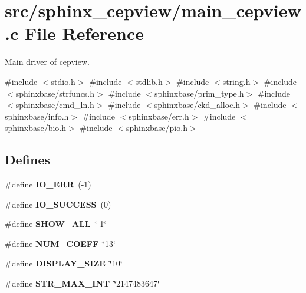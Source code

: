 \section{src/sphinx\-\_\-cepview/main\-\_\-cepview.c \-File \-Reference}
\label{main__cepview_8c}


\-Main driver of cepview.  


{\ttfamily \#include $<$stdio.\-h$>$}\*
{\ttfamily \#include $<$stdlib.\-h$>$}\*
{\ttfamily \#include $<$string.\-h$>$}\*
{\ttfamily \#include $<$sphinxbase/strfuncs.\-h$>$}\*
{\ttfamily \#include $<$sphinxbase/prim\-\_\-type.\-h$>$}\*
{\ttfamily \#include $<$sphinxbase/cmd\-\_\-ln.\-h$>$}\*
{\ttfamily \#include $<$sphinxbase/ckd\-\_\-alloc.\-h$>$}\*
{\ttfamily \#include $<$sphinxbase/info.\-h$>$}\*
{\ttfamily \#include $<$sphinxbase/err.\-h$>$}\*
{\ttfamily \#include $<$sphinxbase/bio.\-h$>$}\*
{\ttfamily \#include $<$sphinxbase/pio.\-h$>$}\*
\subsection*{\-Defines}
\begin{DoxyCompactItemize}
\item 
\#define {\bfseries \-I\-O\-\_\-\-E\-R\-R}~(-\/1)\label{main__cepview_8c_a2f594e19531c324dd254ba0cc712044d}

\item 
\#define {\bfseries \-I\-O\-\_\-\-S\-U\-C\-C\-E\-S\-S}~(0)\label{main__cepview_8c_adad481c8f8fcb43725ccb11be5c690f4}

\item 
\#define {\bfseries \-S\-H\-O\-W\-\_\-\-A\-L\-L}~\char`\"{}-\/1\char`\"{}\label{main__cepview_8c_aaddcd19f0e123722b857ec68d1d3e156}

\item 
\#define {\bfseries \-N\-U\-M\-\_\-\-C\-O\-E\-F\-F}~\char`\"{}13\char`\"{}\label{main__cepview_8c_a56e7544225bcd9da32fa61cde6e6f523}

\item 
\#define {\bfseries \-D\-I\-S\-P\-L\-A\-Y\-\_\-\-S\-I\-Z\-E}~\char`\"{}10\char`\"{}\label{main__cepview_8c_a035c0b93babde37c8919064af8b67928}

\item 
\#define {\bfseries \-S\-T\-R\-\_\-\-M\-A\-X\-\_\-\-I\-N\-T}~\char`\"{}2147483647\char`\"{}\label{main__cepview_8c_a01f1f09f8562ef6971aa38c4f8f32954}

\end{DoxyCompactItemize}
